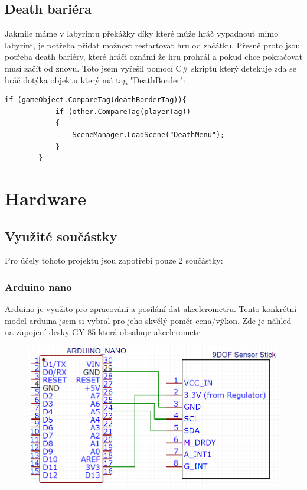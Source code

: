 \documentclass[12pt, a4paper,
twoside        %
]{report}
\let\oldchapter\chapter
\renewcommand{\chapter}{
\clearpage
\pagestyle{plain}
\oldchapter
}
\begin{document}
\section{Death bariéra}
Jakmile máme v labyrintu překážky díky které může hráč vypadnout mimo labyrint, je potřeba přidat možnost restartovat hru od začátku. Přesně proto jsou potřeba death bariéry, které hráči oznámí že hru prohrál a pokud chce pokračovat musí začít od znovu.
Toto jsem vyřešil pomocí C\# skriptu který detekuje zda se hráč dotýka objektu který má tag "DeathBorder":
\begin{lstlisting}[language={[Sharp]C}, caption={C\# skript pro detekování hráče v death borderu}, label={Script}]
if (gameObject.CompareTag(deathBorderTag)){
            if (other.CompareTag(playerTag))
            {
                SceneManager.LoadScene("DeathMenu");
            }
        }
\end{lstlisting}

\chapter{Hardware}

\section{Využité součástky}
\label{sec:soucastky}

Pro účely tohoto projektu jsou zapotřebí pouze 2 součástky:
\subsection{Arduino nano}
Arduino je využito pro zpracování a posílání dat akcelerometru. Tento konkrétní model arduina jsem si vybral pro jeho skvělý poměr cena/výkon. Zde je náhled na zapojení desky GY-85 která obsahuje akcelerometr:
\begin{figure}[h]
    \centering
    \includegraphics[height=0.3\textheight]{image/schema.png}
    \caption{}
\end{figure}
\end{document}
